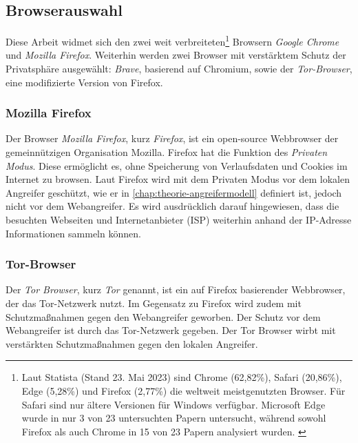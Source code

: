 \subsection{Browserauswahl}
\label{section:methodik-vorbereitung-browserauswahl}
Diese Arbeit widmet sich den zwei weit verbreiteten\footnote{Laut Statista \cite{Statista.23.05.2023}
(Stand 23. Mai 2023) sind Chrome (62,82\%), Safari (20,86\%), Edge (5,28\%) und Firefox (2,77\%) die weltweit meistgenutzten Browser. Für Safari sind nur ältere Versionen für Windows verfügbar. Microsoft Edge wurde in nur 3 von 23 untersuchten Papern untersucht, während sowohl Firefox als auch Chrome in 15 von 23 Papern analysiert wurden. \cite{Fayyad.2021, Horsman.2019, Gabet.2018, Aggarwal.2010, Oh.2011, Said.2011, Ohana.2013, Satvat.2014, Montasari.2015, Nalawade.2016, Rochmadi.2017, Md.2018, Muir.2019, Mahlous.2020, Izzati.2022}} Browsern \textit{Google Chrome} und \textit{Mozilla Firefox}.
Weiterhin werden zwei Browser mit verstärktem Schutz der Privatsphäre ausgewählt: \textit{Brave}, basierend auf Chromium, sowie der \textit{Tor-Browser}, eine modifizierte Version von Firefox.

\subsubsection*{Mozilla Firefox}
\label{subsubsection:methodik-vorbereitung-browserauswahl-firefox}
Der Browser \textit{Mozilla Firefox}, kurz \textit{Firefox}, ist ein open-source Webbrowser der gemeinnützigen Organisation Mozilla. 
Firefox hat die Funktion des \textit{Privaten Modus}. Diese ermöglicht es, ohne Speicherung von Verlaufsdaten und Cookies im Internet zu browsen.
Laut Firefox wird mit dem Privaten Modus vor dem lokalen Angreifer geschützt, wie er in \autoref{chap:theorie-angreifermodell} definiert ist, jedoch nicht vor dem Webangreifer.
Es wird ausdrücklich darauf hingewiesen, dass die besuchten Webseiten und Internetanbieter (ISP) weiterhin anhand der IP-Adresse Informationen sammeln können. \cite{Mozilla.05.06.2023}

\subsubsection*{Tor-Browser}
\label{subsubsection:methodik-vorbereitung-browserauswahl-tor}
Der \textit{Tor Browser}, kurz \textit{Tor} genannt, ist ein auf Firefox basierender Webbrowser, der das Tor-Netzwerk nutzt.
Im Gegensatz zu Firefox wird zudem mit Schutzmaßnahmen gegen den Webangreifer geworben.
Der Schutz vor dem Webangreifer ist durch das Tor-Netzwerk gegeben.
Der Tor Browser wirbt mit verstärkten Schutzmaßnahmen gegen den lokalen Angreifer. \cite{Tor.24.05.2023}

